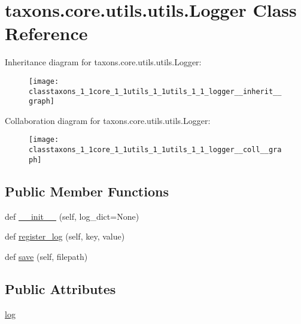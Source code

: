 \hypertarget{classtaxons_1_1core_1_1utils_1_1utils_1_1_logger}{}\section{taxons.\+core.\+utils.\+utils.\+Logger Class Reference}
\label{classtaxons_1_1core_1_1utils_1_1utils_1_1_logger}


Inheritance diagram for taxons.\+core.\+utils.\+utils.\+Logger\+:
\nopagebreak
\begin{figure}[H]
\begin{center}
\leavevmode
\texttt{[image: classtaxons\_1\_1core\_1\_1utils\_1\_1utils\_1\_1\_logger\_\_inherit\_\_graph]}
\end{center}
\end{figure}


Collaboration diagram for taxons.\+core.\+utils.\+utils.\+Logger\+:
\nopagebreak
\begin{figure}[H]
\begin{center}
\leavevmode
\texttt{[image: classtaxons\_1\_1core\_1\_1utils\_1\_1utils\_1\_1\_logger\_\_coll\_\_graph]}
\end{center}
\end{figure}
\subsection*{Public Member Functions}
\begin{DoxyCompactItemize}
\item 
def \hyperlink{classtaxons_1_1core_1_1utils_1_1utils_1_1_logger_a18643e3ee18effde599260ce99dfa4cd}{\+\_\+\+\_\+init\+\_\+\+\_\+} (self, log\+\_\+dict=None)
\item 
def \hyperlink{classtaxons_1_1core_1_1utils_1_1utils_1_1_logger_a1d74d15ad2d04667e3bb268318923618}{register\+\_\+log} (self, key, value)
\item 
def \hyperlink{classtaxons_1_1core_1_1utils_1_1utils_1_1_logger_a6702a15d319a8e14f3d05c6ce67d69ae}{save} (self, filepath)
\end{DoxyCompactItemize}
\subsection*{Public Attributes}
\begin{DoxyCompactItemize}
\item 
\hyperlink{classtaxons_1_1core_1_1utils_1_1utils_1_1_logger_a961d2f3718cdde387d9d6233fa49cbe3}{log}
\end{DoxyCompactItemize}


